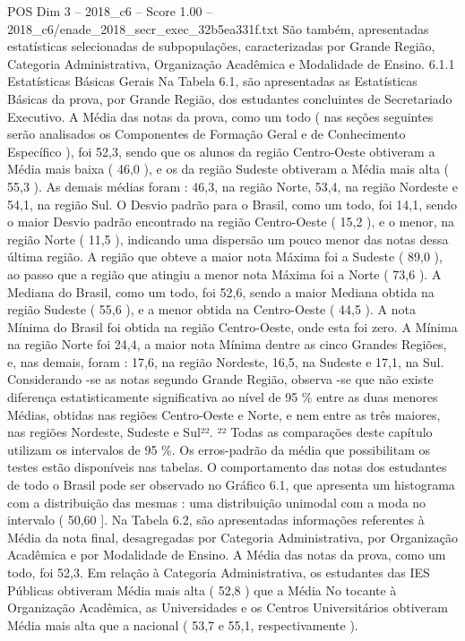 \begin{textsample}{POS Dim 3 – 2018\_c6 – Score 1.00 – 2018\_c6/enade\_2018\_secr\_exec\_32b5ea331f.txt}
São também, apresentadas estatísticas selecionadas de subpopulações, caracterizadas por Grande Região, Categoria Administrativa, Organização Acadêmica e Modalidade de Ensino. 6.1.1 Estatísticas Básicas Gerais Na Tabela 6.1, são apresentadas as Estatísticas Básicas da prova, por Grande Região, dos estudantes concluintes de Secretariado Executivo.
A Média das notas da prova, como um todo ( nas seções seguintes serão analisados os Componentes de Formação Geral e de Conhecimento Específico ), foi 52,3, sendo que os alunos da região Centro-Oeste obtiveram a Média mais baixa ( 46,0 ), e os da região Sudeste obtiveram a Média mais alta ( 55,3 ).
As demais médias foram : 46,3, na região Norte, 53,4, na região Nordeste e 54,1, na região Sul.
O Desvio padrão para o Brasil, como um todo, foi 14,1, sendo o maior Desvio padrão encontrado na região Centro-Oeste ( 15,2 ), e o menor, na região Norte ( 11,5 ), indicando uma dispersão um pouco menor das notas dessa última região.
A região que obteve a maior nota Máxima foi a Sudeste ( 89,0 ), ao passo que a região que atingiu a menor nota Máxima foi a Norte ( 73,6 ).
A Mediana do Brasil, como um todo, foi 52,6, sendo a maior Mediana obtida na região Sudeste ( 55,6 ), e a menor obtida na Centro-Oeste ( 44,5 ).
A nota Mínima do Brasil foi obtida na região Centro-Oeste, onde esta foi zero.
A Mínima na região Norte foi 24,4, a maior nota Mínima dentre as cinco Grandes Regiões, e, nas demais, foram : 17,6, na região Nordeste, 16,5, na Sudeste e 17,1, na Sul.
Considerando -se as notas segundo Grande Região, observa -se que não existe diferença estatisticamente significativa ao nível de 95 \% entre as duas menores Médias, obtidas nas regiões Centro-Oeste e Norte, e nem entre as três maiores, nas regiões Nordeste, Sudeste e Sul²². ²² Todas as comparações deste capítulo utilizam os intervalos de 95 \%.
Os erros-padrão da média que possibilitam os testes estão disponíveis nas tabelas.
O comportamento das notas dos estudantes de todo o Brasil pode ser observado no Gráfico 6.1, que apresenta um histograma com a distribuição das mesmas : uma distribuição unimodal com a moda no intervalo ( 50,60 ].
Na Tabela 6.2, são apresentadas informações referentes à Média da nota final, desagregadas por Categoria Administrativa, por Organização Acadêmica e por Modalidade de Ensino.
A Média das notas da prova, como um todo, foi 52,3.
Em relação à Categoria Administrativa, os estudantes das IES Públicas obtiveram Média mais alta ( 52,8 ) que a Média No tocante à Organização Acadêmica, as Universidades e os Centros Universitários obtiveram Média mais alta que a nacional ( 53,7 e 55,1, respectivamente ).

\end{textsample}
